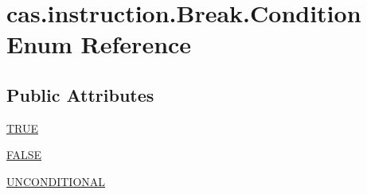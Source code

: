 \hypertarget{enumcas_1_1instruction_1_1_break_1_1_condition}{\section{cas.\-instruction.\-Break.\-Condition Enum Reference}
\label{enumcas_1_1instruction_1_1_break_1_1_condition}
}
\subsection*{Public Attributes}
\begin{DoxyCompactItemize}
\item 
\hyperlink{enumcas_1_1instruction_1_1_break_1_1_condition_a7f89a8ea0cddc0f9378493ddb5d1a201}{T\-R\-U\-E}
\item 
\hyperlink{enumcas_1_1instruction_1_1_break_1_1_condition_a2372c7e392b97589dc4ce34527beb277}{F\-A\-L\-S\-E}
\item 
\hyperlink{enumcas_1_1instruction_1_1_break_1_1_condition_a2f5fc0c2168301cdf11006129bb573e0}{U\-N\-C\-O\-N\-D\-I\-T\-I\-O\-N\-A\-L}
\end{DoxyCompactItemize}


